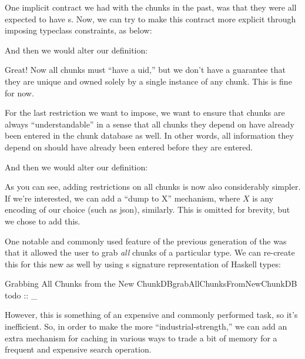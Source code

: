 One implicit contract we had with the chunks in the past, was that they were all
expected to have \UID{}s. Now, we can try to make this contract more explicit
through imposing typeclass constraints, as below:

\uidOwnershipContract{}

And then we would alter our \Chunk{} definition:

\chunksWithUidConstraint{}

Great! Now all chunks must ``have a \acs{uid},'' but we don't have a guarantee
that they are unique and owned solely by a single instance of any chunk. This is
fine for now.

For the last restriction we want to impose, we want to ensure that chunks are
always ``understandable'' in a sense that all chunks they depend on have already
been entered in the chunk database as well. In other words, all information they
depend on should have already been entered before they are entered.

\chunkDependenciesContract{}

And then we would alter our \Chunk{} definition:

\chunksWithUidAndRefListConstraint{}

As you can see, adding restrictions on all chunks is now also considerably
simpler. If we're interested, we can add a ``dump to X'' mechanism, where $X$ is
any encoding of our choice (such as \acs{json}), similarly. This is omitted for
brevity, but we chose to add this.


One notable and commonly used feature of the previous generation of the
\ChunkDB{} was that it allowed the user to grab \textit{all} chunks of a
particular type. We can re-create this for this new \ChunkDB{} as well by using
s \TypeRep{} signature representation of Haskell types:

\begin{pseudohaskell}{Grabbing All Chunks from the New ChunkDB}{grabAllChunksFromNewChunkDB}
todo :: _
\end{pseudohaskell}


However, this is something of an expensive and commonly performed task, so it's
inefficient. So, in order to make the \ChunkDB{} more ``industrial-strength,''
we can add an extra mechanism for caching in various ways to trade a bit of
memory for a frequent and expensive search operation.

